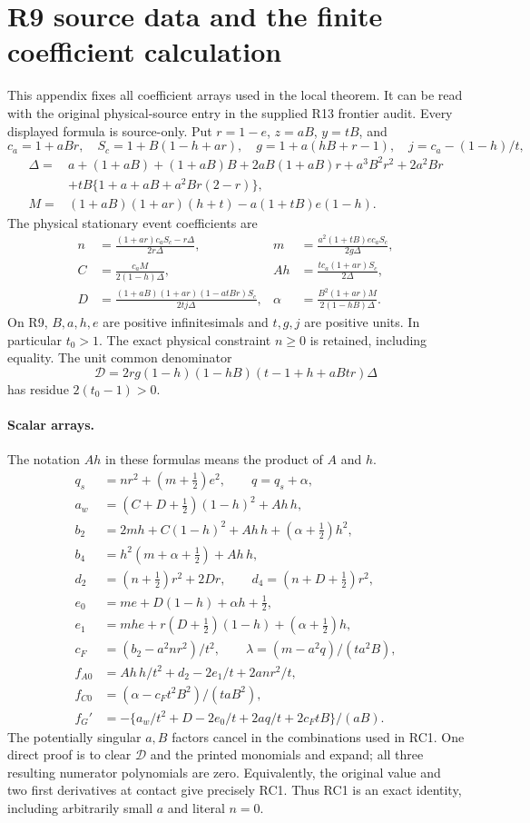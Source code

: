 \section{R9 source data and the finite coefficient calculation}
This appendix fixes all coefficient arrays used in the local theorem.
It can be read with the original physical-source entry in the supplied
R13 frontier audit. Every displayed formula is source-only.
Put $r=1-e$, $z=aB$, $y=tB$, and
\[
 c_a=1+aBr,\quad S_c=1+B(1-h+ar),\quad
 g=1+a(hB+r-1),\quad j=c_a-(1-h)/t,
\]
\begin{align*}
\Delta={}&a+(1+aB)+(1+aB)B+2aB(1+aB)r+a^3B^2r^2+2a^2Br\\
 &+tB\{1+a+aB+a^2Br(2-r)\},\\
M={}&(1+aB)(1+ar)(h+t)-a(1+tB)e(1-h).
\end{align*}
The physical stationary event coefficients are
\[
\begin{aligned}
n&=\frac{(1+ar)c_aS_c-r\Delta}{2r\Delta},&
m&=\frac{a^2(1+tB)e c_aS_c}{2g\Delta},\\
C&=\frac{c_aM}{2(1-h)\Delta},&
Ah&=\frac{t c_a(1+ar)S_c}{2\Delta},\\
D&=\frac{(1+aB)(1+ar)(1-atBr)S_c}{2tj\Delta},&
\alpha&=\frac{B^2(1+ar)M}{2(1-hB)\Delta}.
\end{aligned}
\]
On R9, $B,a,h,e$ are positive infinitesimals and $t,g,j$ are
positive units. In particular $t_0>1$. The exact physical constraint
$n\ge0$ is retained, including equality. The unit common denominator
\[
\mathcal D=2rg(1-h)(1-hB)(t-1+h+aBtr)\Delta
\]
has residue $2(t_0-1)>0$.

\paragraph{Scalar arrays.}
The notation $Ah$ in these formulas means the product of $A$ and $h$.
\[
\begin{aligned}
q_s&=nr^2+(m+\tfrac12)e^2,\qquad q=q_s+\alpha,\\
a_w&=(C+D+\tfrac12)(1-h)^2+Ah\,h,\\
b_2&=2mh+C(1-h)^2+Ah\,h+(\alpha+\tfrac12)h^2,\\
b_4&=h^2(m+\alpha+\tfrac12)+Ah\,h,\\
d_2&=(n+\tfrac12)r^2+2Dr,\qquad
d_4=(n+D+\tfrac12)r^2,\\
e_0&=me+D(1-h)+\alpha h+\tfrac12,\\
e_1&=mhe+r(D+\tfrac12)(1-h)+(\alpha+\tfrac12)h,\\
c_F&=(b_2-a^2nr^2)/t^2,\qquad
\lambda=(m-a^2q)/(ta^2B),\\
f_{A0}&=Ah\,h/t^2+d_2-2e_1/t+2anr^2/t,\\
f_{C0}&=(\alpha-c_Ft^2B^2)/(taB^2),\\
f_G'&=-\{a_w/t^2+D-2e_0/t+2aq/t+2c_FtB\}/(aB).
\end{aligned}
\]
The potentially singular $a,B$ factors cancel in the combinations
used in RC1. One direct proof is to clear $\mathcal D$ and the printed
monomials and expand; all three resulting numerator polynomials are
zero. Equivalently, the original value and two first derivatives at
contact give precisely RC1. Thus RC1 is an exact identity, including
arbitrarily small $a$ and literal $n=0$.

